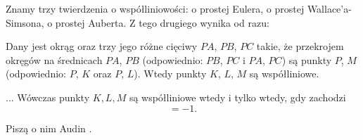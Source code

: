 Znamy trzy twierdzenia o współliniowości: o prostej Eulera, o prostej Wallace'a-Simsona, o prostej Auberta.
Z tego drugiego wynika od razu:

\begin{proposition}
	Dany jest okrąg oraz trzy jego różne cięciwy $PA$, $PB$, $PC$ takie, że przekrojem okręgów na średnicach $PA$, $PB$ (odpowiednio: $PB$, $PC$ i $PA$, $PC$) są punkty $P$, $M$ (odpowiednio: $P$, $K$ oraz $P$, $L$).
	Wtedy punkty $K$, $L$, $M$ są współliniowe.
\end{proposition}

\begin{proposition}
	...
	Wówczas punkty $K, L, M$ są współliniowe wtedy i tylko wtedy, gdy zachodzi
	\begin{equation}
		[AMB] [BKC] [CLA] = -1.
	\end{equation}
\end{proposition}

%

Piszą o nim Audin \cite[s. 38]{audin_2003}.

